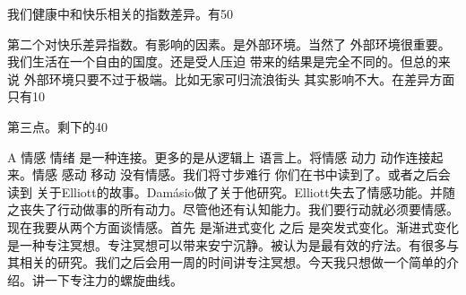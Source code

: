 我们健康中和快乐相关的指数差异。有50%

第二个对快乐差异指数。有影响的因素。是外部环境。当然了 外部环境很重要。我们生活在一个自由的国度。还是受人压迫 带来的结果是完全不同的。但总的来说 外部环境只要不过于极端。比如无家可归流浪街头 其实影响不大。在差异方面只有10%

第三点。剩下的40%

A 情感 情绪 是一种连接。更多的是从逻辑上 语言上。将情感 动力 动作连接起来。情感 感动 移动 没有情感。我们将寸步难行 你们在书中读到了。或者之后会读到 关于Elliott的故事。Damásio做了关于他研究。Elliott失去了情感功能。并随之丧失了行动做事的所有动力。尽管他还有认知能力。我们要行动就必须要情感。现在我要从两个方面谈情感。首先 是渐进式变化 之后 是突发式变化。渐进式变化是一种专注冥想。专注冥想可以带来安宁沉静。被认为是最有效的疗法。有很多与其相关的研究。我们之后会用一周的时间讲专注冥想。今天我只想做一个简单的介绍。讲一下专注力的螺旋曲线。 

